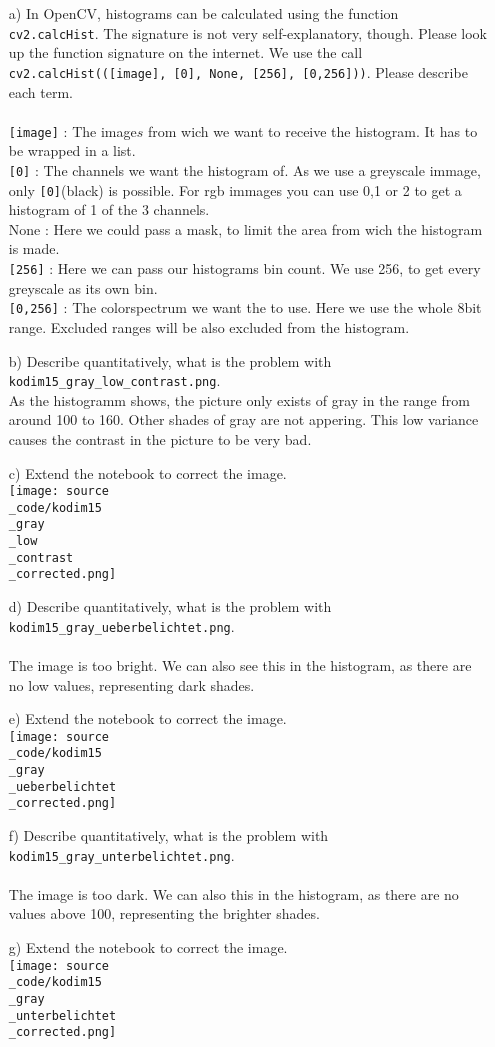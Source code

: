 \begin{enumerate}
\item[a)] In OpenCV, histograms can be calculated using the function \texttt{cv2.calcHist}. The signature is not very self-explanatory, though. Please look up
the function signature on the internet. We use the call \texttt{cv2.calcHist(([image], [0], None, [256], [0,256]))}. Please describe each term.\\
\\
\texttt{[image]} : The image\(s\) from wich we want to receive the histogram. It has to be wrapped in a list.\\
\texttt{[0]} : The channels we want the histogram of. As we use a greyscale immage, only \texttt{[0]}(black) is possible. For rgb immages you can use 0,1 or 2 to get a histogram of 1 of the 3 channels.\\
None : Here we could pass a mask, to limit the area from wich the histogram is made.\\
\texttt{[256]} : Here we can pass our histograms bin count. We use 256, to get every greyscale as its own bin.\\
\texttt{[0,256]} : The colorspectrum we want the to use. Here we use the whole 8bit range. Excluded ranges will be also excluded from the histogram.\\
\item[b)] Describe quantitatively, what is the problem with \texttt{kodim15\_gray\_low\_contrast.png}. \\

As the histogramm shows, the picture only exists of gray in the range from around 100 to 160. Other shades of gray are not appering. This low variance causes the contrast in the picture to be very bad.
\item[c)] Extend the notebook to correct the image. \\
\texttt{[image: source\\\_code/kodim15\\\_gray\\\_low\\\_contrast\\\_corrected.png]}

\item[d)] Describe quantitatively, what is the problem with \texttt{kodim15\_gray\_ueberbelichtet.png}. \\
\\
The image is too bright. We can also see this in the histogram, as there are no low values, representing dark shades.
\item[e)] Extend the notebook to correct the image. \\
\texttt{[image: source\\\_code/kodim15\\\_gray\\\_ueberbelichtet\\\_corrected.png]}

\item[f)] Describe quantitatively, what is the problem with \texttt{kodim15\_gray\_unterbelichtet.png}. \\
\\
The image is too dark. We can also this in the histogram, as there are no values above 100, representing the brighter shades.
\item[g)] Extend the notebook to correct the image. \\
\texttt{[image: source\\\_code/kodim15\\\_gray\\\_unterbelichtet\\\_corrected.png]}
\end{enumerate}

